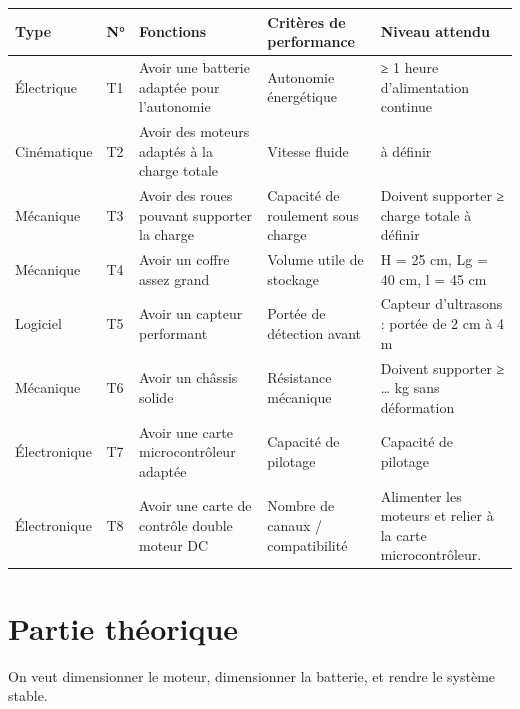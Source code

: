 \documentclass[a4paper,12pt]{report}  %
\begin{document}
{\fontsize{10pt}{12pt}\selectfont 
	\begin{longtable}{|l|l|p{4cm}|p{4cm}|p{4cm}|}
		\hline
		\textbf{Type} & \textbf{N°} & \textbf{Fonctions} 
		& \textbf{Critères de performance} & \textbf{Niveau attendu} \\
		\hline
		\endhead
		
		\hline
		\endfoot
		
		\hline
		Électrique & T1 & Avoir une batterie adaptée pour l'autonomie &
		Autonomie énergétique & ≥ 1 heure d'alimentation continue \\
		
		\hline
		Cinématique & T2 & Avoir des moteurs adaptés à la charge totale &
		Vitesse fluide & à définir \\
		
		\hline
		Mécanique & T3 & Avoir des roues pouvant supporter la charge & Capacité
		de roulement sous charge & Doivent supporter ≥ charge totale à définir \\
		
		\hline
		Mécanique & T4 & Avoir un coffre assez grand & Volume utile de stockage
		& H = 25 cm, Lg = 40 cm, l = 45 cm \\
		
		\hline
		Logiciel & T5 & Avoir un capteur performant & Portée de détection avant
		& Capteur d'ultrasons : portée de 2 cm à 4 m  \\
		
		\hline
		Mécanique & T6 & Avoir un châssis solide & Résistance mécanique &
		Doivent supporter ≥ \ldots{} kg sans déformation \\
		
		\hline
		Électronique & T7 & Avoir une carte microcontrôleur adaptée & Capacité
		de pilotage & Capacité de pilotage \\
		
		\hline
		Électronique & T8 & Avoir une carte de contrôle double moteur DC &
		Nombre de canaux / compatibilité & Alimenter les moteurs et relier à la
		carte microcontrôleur. \\
		
	\end{longtable}
}



\section{Partie théorique}
On veut dimensionner le moteur, dimensionner la batterie, et rendre le système stable. 
\end{document}
